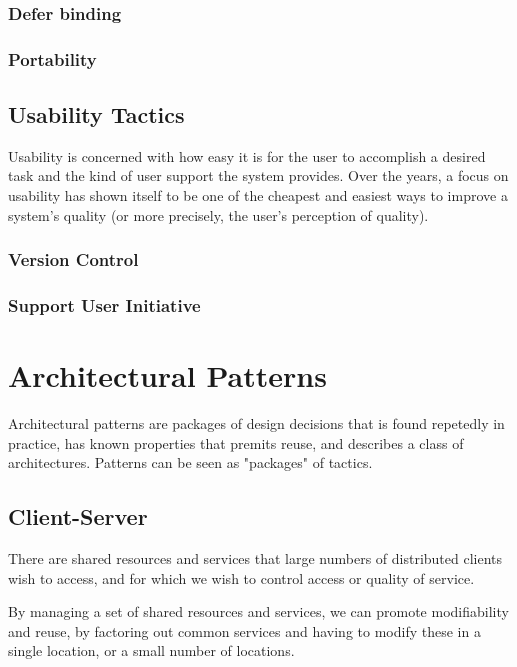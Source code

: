 \documentclass{report}
\begin{document}
\subsubsection{Defer binding}

\subsubsection{Portability}

\subsection{Usability Tactics}
Usability is concerned with how easy it is for the user to accomplish a desired task and the kind of user support the system provides. Over the years, a focus on usability has shown itself to be one of the cheapest and easiest ways to improve a system's quality (or more precisely, the user's perception of quality).\cite[page 175]{book:bass}

\subsubsection{Version Control}


\subsubsection{Support User Initiative}





\section{Architectural Patterns} \label{sec:architectural_patterns}
Architectural patterns are packages of design decisions that is found repetedly in practice, has known properties that premits reuse, and describes a class of architectures. Patterns can be seen as "packages" of tactics.

\subsection{Client-Server}
There are shared resources and services that large numbers of distributed clients wish to access, and for which we wish to control access or quality of service.

By managing a set of shared resources and services, we can promote modifiability and reuse, by factoring out common services and having to modify these in a single location, or a small number of locations.
\end{document}
